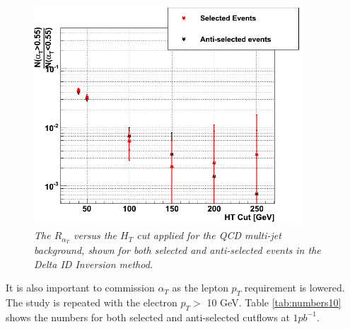 \documentclass[12pt]{article}
\begin{document}
\begin{figure}[h!]
\begin{center}
\includegraphics[width=100mm]{leptonicalphaT/AlphaTRatio}
\end{center}
\caption{\textit{The $R_{\alpha_T}$ versus the $H_{T}$ cut applied for the QCD multi-jet background, shown for both selected and anti-selected events in the Delta ID Inversion method.}}
\label{fig:AlphaT_Ratio}
\end{figure}

It is also important to commission $\alpha_{T}$ as the lepton $p_{T}$ requirement is lowered. The study is repeated with the electron $p_{T} >$ 10 GeV. Table \ref{tab:numbers10} shows the numbers for both selected and anti-selected cutflows at $1pb^{-1}$. 
\end{document}
